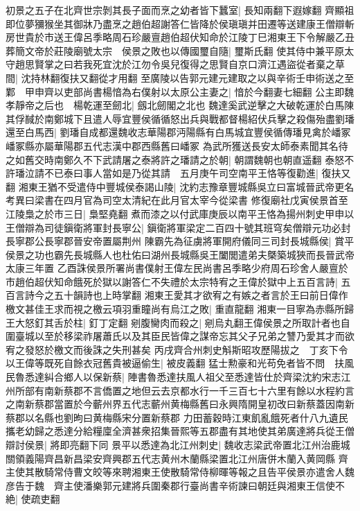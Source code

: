 初景之五子在北齊世宗剝其長子面而烹之幼者皆下蠶室|{
	長知兩翻下遐嫁翻}
齊顯祖即位夢獼猴坐其御牀乃盡烹之趙伯超謝答仁皆降於侯瑱瑱并田遷等送建康王僧辯斬房世貴於市送王偉呂季略周石珍嚴亶趙伯超伏知命於江陵丁巳湘東王下令解嚴乙丑葬簡文帝於莊陵廟號太宗　侯景之敗也以傳國璽自隨|{
	璽斯氏翻}
使其侍中兼平原太守趙思賢掌之曰若我死宜沈於江勿令吳兒復得之思賢自京口濟江遇盜從者棄之草間|{
	沈持林翻復扶又翻從才用翻}
至廣陵以告郭元建元建取之以與辛術壬申術送之至鄴　甲申齊以吏部尚書楊愔為右僕射以太原公主妻之|{
	愔於今翻妻七細翻}
公主即魏孝靜帝之后也　楊乾運至劒北|{
	劔北劒閣之北也}
魏達奚武逆擊之大破乾運於白馬陳其俘馘於南鄭城下且遣人辱宜豐侯循循怒出兵與戰都督楊紹伏兵擊之殺傷殆盡劉璠還至白馬西|{
	劉璠自成都還魏收志華陽郡沔陽縣有白馬城宜豐侯循傳璠見禽於嶓冢嶓冢縣亦屬華陽郡五代志漢中郡西縣舊曰嶓冢}
為武所獲送長安太師泰素聞其名待之如舊交時南鄭久不下武請屠之泰將許之璠請之於朝|{
	朝謂魏朝也朝直遥翻}
泰怒不許璠泣請不已泰曰事人當如是乃從其請　五月庚午司空南平王恪等復勸進|{
	復扶又翻}
湘東王猶不受遣侍中豐城侯泰謁山陵|{
	沈約志豫章豐城縣吳立曰富城晉武帝更名　考異曰梁書在四月官為司空太清紀在此月官太宰今從梁書}
修復廟社戊寅侯景首至江陵梟之於市三日|{
	梟堅堯翻}
煮而漆之以付武庫庚辰以南平王恪為揚州刺史甲申以王僧辯為司徒鎭衛將軍封長寧公|{
	鎭衛將軍梁定二百四十號其班穹矣僧辯元功必封長寧郡公長寧郡晉安帝置屬荆州}
陳霸先為征虜將軍開府儀同三司封長城縣侯|{
	賞平侯景之功也霸先長城縣人也杜佑曰湖州長城縣吳王闔閭遣弟夫槩築城狹而長晉武帝太康三年置}
乙酉誅侯景所署尚書僕射王偉左民尚書呂季略少府周石珍舍人嚴亶於市趙伯超伏知命餓死於獄以謝答仁不失禮於太宗特宥之王偉於獄中上五百言詩|{
	五百言詩今之五十韻詩也上時掌翻}
湘東王愛其才欲宥之有嫉之者言於王曰前日偉作檄文甚佳王求而視之檄云項羽重瞳尚有烏江之敗|{
	重直龍翻}
湘東一目寧為赤縣所歸王大怒釘其舌於柱|{
	釘丁定翻}
剜腹臠肉而殺之|{
	剜烏丸翻王偉侯景之所取計者也自圍臺城以至於移梁祚屠蕭氏以及其臣民皆偉之謀帝忘其父子兄弟之讐乃愛其才而欲宥之發怒於檄文而後誅之失刑甚矣}
丙戌齊合州刺史斛斯昭攻歷陽拔之　丁亥下令以王偉等既死自餘衣冠舊貴被逼偷生|{
	被皮義翻}
猛士勲豪和光苟免者皆不問　扶風民魯悉達糾合鄉人以保新蔡|{
	陣書魯悉達扶風人祖父至悉達皆仕於齊梁沈約宋志江州所部有南新蔡郡不言僑置之地但云去京都水行一千三百七十六里有餘以水程約言之南新蔡郡當置於今蘄州界五代志蘄州黄梅縣舊曰永興隋開皇初改曰新蔡蓋因南新蔡郡以名縣也劉昫曰黄梅縣宋分置新蔡郡}
力田蓄穀時江東飢亂餓死者什八九遺民攜老幼歸之悉達分給糧廩全濟甚衆招集晉熙等五郡盡有其地使其弟廣達將兵從王僧辯討侯景|{
	將即亮翻下同}
景平以悉達為北江州刺史|{
	魏收志梁武帝置北江州治鹿城關領義陽齊昌新昌梁安齊興郡五代志黄州木蘭縣梁置北江州唐併木蘭入黄岡縣}
齊主使其散騎常侍曹文皎等來聘湘東王使散騎常侍柳暉等報之且告平侯景亦遣舍人魏彦告于魏　齊主使潘樂郭元建將兵圍秦郡行臺尚書辛術諫曰朝廷與湘東王信使不絶|{
	使疏吏翻}
